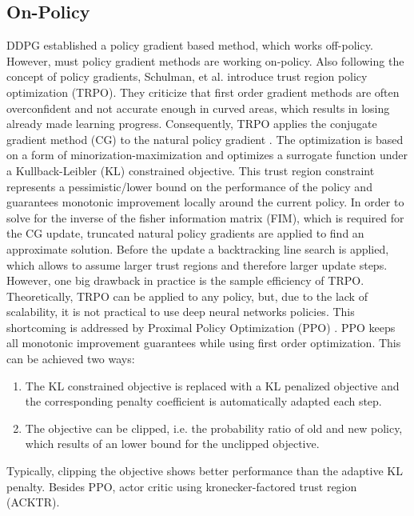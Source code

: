     \subsection{On-Policy}
    \label{sec:on-policy}
   	DDPG established a policy gradient based method, which works off-policy. 
   	However, must policy gradient methods are working on-policy.
    Also following the concept of policy gradients, Schulman, et al. \cite{Schulman2015} introduce trust region policy optimization (TRPO).
    They criticize that first order gradient methods are often overconfident and not accurate enough in curved areas, which results in losing already made learning progress. 
    Consequently, TRPO applies the conjugate gradient method (CG) to the natural policy gradient \cite{Kakade2001}.
    The optimization is based on a form of minorization-maximization \cite{Hunter2004} and optimizes a surrogate function under a Kullback-Leibler (KL) constrained objective.
    This trust region constraint represents a pessimistic/lower bound on the performance of the policy and guarantees monotonic improvement locally around the current policy.	
    In order to solve for the inverse of the fisher information matrix (FIM), which is required for the CG update, truncated natural policy gradients are applied to find an approximate solution. 
    Before the update a backtracking line search is applied, which allows to assume larger trust regions and therefore larger update steps. 
    However, one big drawback in practice is the sample efficiency of TRPO. 
    Theoretically, TRPO can be applied to any policy, but, due to the lack of scalability, it is not practical to use deep neural networks policies.
    This shortcoming is addressed by Proximal Policy Optimization (PPO) \cite{Schulman2017}.
    PPO keeps all monotonic improvement guarantees while using first order optimization. 
    This can be achieved two ways: 
    \begin{enumerate}
    	\item The KL constrained objective is replaced with a KL penalized objective and the corresponding penalty coefficient is automatically adapted each step. 
    	\item The objective can be clipped, i.e. the probability ratio of old and new policy, which results of an lower bound for the unclipped objective. 
    \end{enumerate}
    Typically, clipping the objective shows better performance than the adaptive KL penalty.
    Besides PPO, actor critic using kronecker-factored trust region (ACKTR).
	
